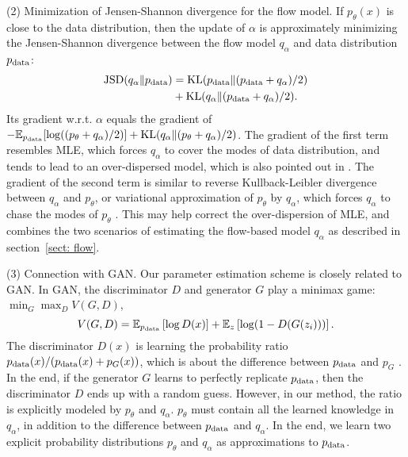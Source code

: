 \documentclass[10pt,twocolumn,letterpaper]{article}
\newcommand{\E}{\mathbb{E}}
\begin{document}
(2) Minimization of Jensen-Shannon divergence for the flow model. If $p_\theta(x)$ is close to the data distribution, then the update of $\alpha$ is approximately minimizing the Jensen-Shannon divergence between the flow model $q_\alpha$ and data distribution $p_{\rm data}$: 
\begin{equation}
\begin{split}
{\rm JSD}(q_\alpha \| p_{\rm data})&={\rm KL}(p_{\rm data}  \| (p_{\rm data} + q_\alpha)/2) \\
&+ {\rm KL}(q_\alpha \| (p_{\rm data} + q_\alpha)/2).
\end{split}
\end{equation}
Its gradient w.r.t. $\alpha$ equals the gradient of $-\E_{p_{\rm data}}[\log((p_\theta + q_\alpha)/2)] + {\rm KL}(q_\alpha \| (p_\theta + q_\alpha)/2)$. The gradient of the first term resembles MLE, which forces $q_\alpha$ to cover the modes of data distribution, and tends to lead to an over-dispersed model, which is also pointed out in \cite{kingma2018Glow}. The gradient of the second term is similar to reverse Kullback-Leibler divergence between $q_\alpha$ and $p_\theta$, or variational approximation of $p_\theta$ by $q_\alpha$, which forces $q_\alpha$ to chase the modes of $p_\theta$ \cite{murphy2012machine,fox2012tutorial}. This may help correct the over-dispersion of MLE, and combines the two scenarios of estimating the flow-based model $q_\alpha$ as described in section~\ref{sect: flow}.  

(3) Connection with GAN. 
Our parameter estimation scheme is closely related to GAN. In GAN, the discriminator $D$ and generator $G$ play a minimax game: $\min_G \max_D V(G, D)$,
\begin{equation}
    V(G, D) = \E_{p_{\rm data}} \left[ \log D(x)\right]
    + \E_z\left[ \log(1 - D(G(z_i)))\right].
\end{equation}
 The discriminator $D(x)$ is learning the probability ratio 
 	 $p_{\rm data}(x)/(p_{\rm data}(x) + p_G(x))$,
 which is about the difference between $p_{\rm data}$ and $p_G$ \cite{finn2016connection}. In the end, if the generator $G$ learns to perfectly replicate $p_{\rm data}$, then the discriminator $D$ ends up with a random guess. However, in our method, the  ratio is explicitly modeled by $p_\theta$ and $q_\alpha$. $p_\theta$ must contain all the learned knowledge in $q_\alpha$, in addition to the difference between $p_{\rm data}$ and $q_\alpha$. In the end, we learn two explicit probability distributions $p_\theta$ and $q_\alpha$ as approximations to $p_{\rm data}$.  
 
\end{document}
